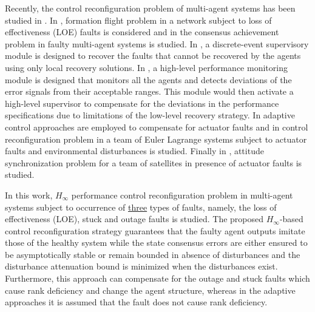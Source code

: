 \documentclass[12pt,draftcls,onecolumn]{IEEEtran}
\begin{document}
Recently, the control reconfiguration problem of multi-agent systems has been studied in  \cite{Tousi2012,Azizi11,ACC2014,ECC2014,Zhou2014,Zhao2014,Chen2014,Wang2015-2,Wang2015-3,Mehrabian2011,Mehrabian2011-2,Li2012,Xiao2013}. In \cite{Tousi2012,Azizi11}, formation flight problem in a network subject to loss of effectiveness (LOE) faults is considered and in  \cite{ACC2014,ECC2014,Zhou2014} the consensus achievement problem in faulty multi-agent systems is studied.  In  \cite{Tousi2012}, a discrete-event supervisory module is designed to recover the faults that cannot be recovered by the agents using only local recovery solutions. In \cite{Azizi11}, a  high-level performance monitoring  module is designed  that monitors all the agents and detects deviations of the error signals from their acceptable ranges. This module would then activate a high-level supervisor to compensate for the deviations in the performance specifications due to limitations of the low-level recovery strategy. In \cite{Zhao2014,Chen2014,Wang2015-2,Wang2015-3} adaptive control approaches are employed to compensate for actuator faults and in \cite{Mehrabian2011,Mehrabian2011-2} control reconfiguration problem in a team of Euler Lagrange systems subject to actuator faults and environmental disturbances is studied. Finally in \cite{Li2012,Xiao2013},  attitude synchronization problem for a team of satellites in presence of actuator faults is studied.  \par

In this work,  $H_{\infty}$ performance  control reconfiguration problem in multi-agent systems subject to occurrence of \underline{three} types of faults, namely, the loss of effectiveness (LOE), stuck and outage faults is studied. 
The proposed $H_\infty$-based control reconfiguration  strategy  guarantees that the faulty agent outputs imitate those of the healthy system while  the state consensus errors are either ensured to be asymptotically stable or  remain bounded 
 in  absence of disturbances and  the disturbance attenuation bound is minimized when the disturbances exist. {Furthermore, this approach can compensate for the outage and stuck faults which cause rank deficiency and change the agent structure, whereas in the adaptive approaches it is assumed that the fault does not cause rank deficiency.  }
 
\end{document}
